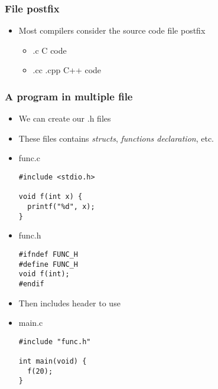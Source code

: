 \documentclass{../c-lecture}
\subtitle{Miscellaneous}
\begin{document}
\begin{frame}
  \titlepage{}
\end{frame}

\begin{frame}
  \frametitle{File postfix}
  \begin{itemize}
    \item Most compilers consider the source code file postfix
    \begin{itemize}
      \item .c \textrightarrow C code
      \item .cc .cpp \textrightarrow C++ code
    \end{itemize}
  \end{itemize}
\end{frame}

\begin{frame}[fragile]
  \frametitle{A program in multiple file}
  \begin{itemize}
    \item We can create our {\color{Yellow} .h} files
    \item
      These files contains \textit{\color{YellowOrange} structs},
      \textit{\color{LimeGreen} functions declaration}, etc.
    \item func.c
    \begin{verbatim}
#include <stdio.h>

void f(int x) {
  printf("%d", x);
}
    \end{verbatim}
    \item func.h
    \begin{verbatim}
#ifndef FUNC_H
#define FUNC_H
void f(int);
#endif
    \end{verbatim}
  \end{itemize}
\end{frame}

\begin{frame}[fragile]
  \begin{itemize}
    \item Then includes header to use
    \item main.c
    \begin{verbatim}
#include "func.h"

int main(void) {
  f(20);
}
    \end{verbatim}
  \end{itemize}
\end{frame}
\end{document}
